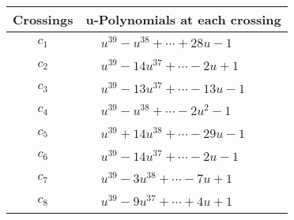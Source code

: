 \documentclass[1p]{elsarticle_modified}
\theoremstyle{definition}
\begin{document}
\begin{tabular}{m{50pt}|m{274pt}}
Crossings & \hspace{64pt}u-Polynomials at each crossing \\
\hline $$\begin{aligned}c_{1}\end{aligned}$$&$\begin{aligned}
&u^{39}- u^{38}+\cdots+28 u-1
\end{aligned}$\\
\hline $$\begin{aligned}c_{2}\end{aligned}$$&$\begin{aligned}
&u^{39}-14 u^{37}+\cdots-2 u+1
\end{aligned}$\\
\hline $$\begin{aligned}c_{3}\end{aligned}$$&$\begin{aligned}
&u^{39}-13 u^{37}+\cdots-13 u-1
\end{aligned}$\\
\hline $$\begin{aligned}c_{4}\end{aligned}$$&$\begin{aligned}
&u^{39}- u^{38}+\cdots-2 u^2-1
\end{aligned}$\\
\hline $$\begin{aligned}c_{5}\end{aligned}$$&$\begin{aligned}
&u^{39}+14 u^{38}+\cdots-29 u-1
\end{aligned}$\\
\hline $$\begin{aligned}c_{6}\end{aligned}$$&$\begin{aligned}
&u^{39}-14 u^{37}+\cdots-2 u-1
\end{aligned}$\\
\hline $$\begin{aligned}c_{7}\end{aligned}$$&$\begin{aligned}
&u^{39}-3 u^{38}+\cdots-7 u+1
\end{aligned}$\\
\hline $$\begin{aligned}c_{8}\end{aligned}$$&$\begin{aligned}
&u^{39}-9 u^{37}+\cdots+4 u+1
\end{aligned}$\\

\end{tabular}
\end{document}
